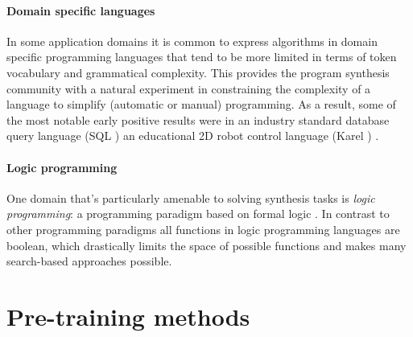 \paragraph{Domain specific languages}

In some application domains it is common to express algorithms in domain specific programming languages \cite{fowlerDomainspecificLanguages2010, hudakDomainspecificLanguages1997, karsaiDesignGuidelinesDomain2014, kosarComparingGeneralpurposeDomainspecific2010, kosarDomainspecificLanguagesSystematic2016, mernikWhenHowDevelop2005} that tend to be more limited in terms of token vocabulary and grammatical complexity.
This provides the program synthesis community with a natural experiment in constraining the complexity of a language to simplify (automatic or manual) programming.
As a result, some of the most notable early positive results were in an industry standard database query language (SQL \cite{groffSQLCompleteReference2002}) \cite{liCanLlmAlready2024, yuSpiderLargescaleHumanlabeled2018} an educational 2D robot control language (Karel \cite{pattisKarelRobotGentle1994}) \cite{metainduction}.

\paragraph{Logic programming}

One domain that's particularly amenable to solving synthesis tasks is \emph{logic programming}: a programming paradigm based on formal logic \cite{doetsLogicLogicProgramming1994, lloydFoundationsLogicProgramming2012}. 
In contrast to other programming paradigms \cite{floydParadigmsProgramming2007, gorodniaiaStudyProgrammingParadigms2016, krishnamurthi13ProgrammingParadigms2019, vanroyProgrammingParadigmsDummies2009} all functions in logic programming languages are boolean, which drastically limits the space of possible functions and makes many search-based approaches possible.



\newpage
\section{Pre-training methods}
\label{sec:pretrain}

